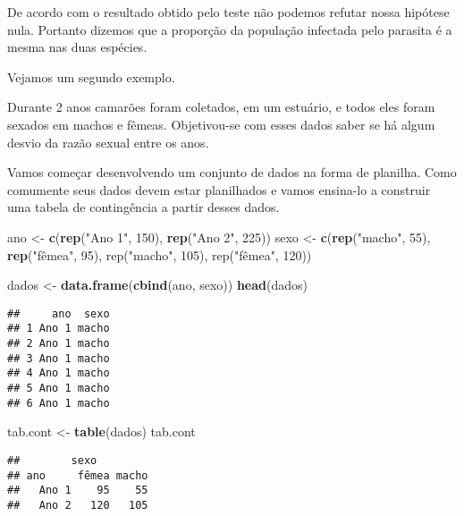 \documentclass[]{book}
\newenvironment{Shaded}{\begin{snugshade}}{\end{snugshade}}
\newcommand{\DecValTok}[1]{\textcolor[rgb]{0.00,0.00,0.81}{#1}}
\newcommand{\KeywordTok}[1]{\textcolor[rgb]{0.13,0.29,0.53}{\textbf{#1}}}
\newcommand{\NormalTok}[1]{#1}
\newcommand{\StringTok}[1]{\textcolor[rgb]{0.31,0.60,0.02}{#1}}
\begin{document}
De acordo com o resultado obtido pelo teste não podemos refutar nossa hipótese nula. Portanto dizemos que a proporção da população infectada pelo parasita é a mesma nas duas espécies.

Vejamos um segundo exemplo.

Durante 2 anos camarões foram coletados, em um estuário, e todos eles foram sexados em machos e fêmeas. Objetivou-se com esses dados saber se há algum desvio da razão sexual entre os anos.

Vamos começar desenvolvendo um conjunto de dados na forma de planilha. Como comumente seus dados devem estar planilhados e vamos ensina-lo a construir uma tabela de contingência a partir desses dados.

\begin{Shaded}
\begin{Highlighting}[]
\NormalTok{ano <-}\StringTok{ }\KeywordTok{c}\NormalTok{(}\KeywordTok{rep}\NormalTok{(}\StringTok{"Ano 1"}\NormalTok{, }\DecValTok{150}\NormalTok{), }\KeywordTok{rep}\NormalTok{(}\StringTok{"Ano 2"}\NormalTok{, }\DecValTok{225}\NormalTok{))}
\NormalTok{sexo <-}\StringTok{ }\KeywordTok{c}\NormalTok{(}\KeywordTok{rep}\NormalTok{(}\StringTok{"macho"}\NormalTok{, }\DecValTok{55}\NormalTok{), }\KeywordTok{rep}\NormalTok{(}\StringTok{"fêmea", 95), rep("}\NormalTok{macho}\StringTok{", 105), rep("}\NormalTok{fêmea", }\DecValTok{120}\NormalTok{))}

\NormalTok{dados <-}\StringTok{ }\KeywordTok{data.frame}\NormalTok{(}\KeywordTok{cbind}\NormalTok{(ano, sexo))}
\KeywordTok{head}\NormalTok{(dados)}
\end{Highlighting}
\end{Shaded}

\begin{verbatim}
##     ano  sexo
## 1 Ano 1 macho
## 2 Ano 1 macho
## 3 Ano 1 macho
## 4 Ano 1 macho
## 5 Ano 1 macho
## 6 Ano 1 macho
\end{verbatim}

\begin{Shaded}
\begin{Highlighting}[]
\NormalTok{tab.cont <-}\StringTok{ }\KeywordTok{table}\NormalTok{(dados)}
\NormalTok{tab.cont}
\end{Highlighting}
\end{Shaded}

\begin{verbatim}
##        sexo
## ano     fêmea macho
##   Ano 1    95    55
##   Ano 2   120   105
\end{verbatim}
\end{document}
